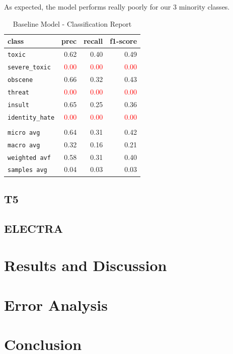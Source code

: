 \documentclass[11pt,a4paper]{article}
\begin{document}
As expected, the model performs really poorly for our 3 minority classes.

\begin{table}
\centering
\begin{tabular}{lrrr}
\hline
\textbf{class} & \textbf{prec} & \textbf{recall} & \textbf{f1-score}\\
\hline
\verb|toxic| & 0.62 & 0.40 & 0.49 \\
\verb|severe_toxic| & \textcolor{red}{0.00} & \textcolor{red}{0.00} & \textcolor{red}{0.00} \\
\verb|obscene| & 0.66 & 0.32 & 0.43 \\
\verb|threat| & \textcolor{red}{0.00} & \textcolor{red}{0.00} & \textcolor{red}{0.00} \\
\verb|insult| & 0.65 & 0.25 & 0.36 \\
\verb|identity_hate| & \textcolor{red}{0.00} & \textcolor{red}{0.00} & \textcolor{red}{0.00} \\
\vspace{2\baselineskip}\\
\verb|micro avg| & 0.64 & 0.31 & 0.42 \\
\verb|macro avg| & 0.32 & 0.16 & 0.21 \\
\verb|weighted avf| & 0.58 & 0.31 & 0.40 \\
\verb|samples avg| & 0.04 & 0.03 & 0.03 \\
\hline
\end{tabular}
\caption{Baseline Model - Classification Report}
\end{table}


\subsection{T5}

\subsection{ELECTRA}

\section{Results and Discussion}

\section{Error Analysis}

\section{Conclusion}
\end{document}
